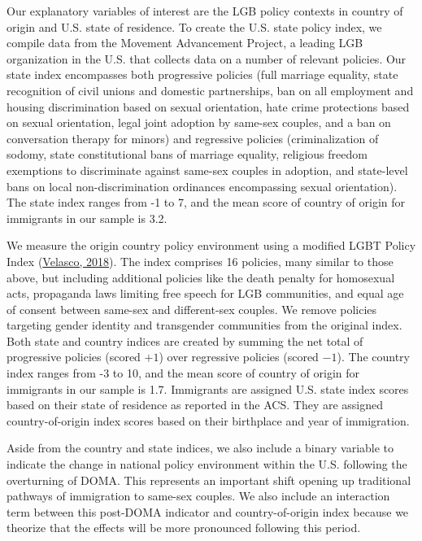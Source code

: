 \documentclass[
  11pt,
]{article}
\begin{document}
Our explanatory variables of interest are the LGB policy contexts in country of origin and U.S. state of residence. To create the U.S. state policy index, we compile data from the Movement Advancement Project, a leading LGB organization in the U.S. that collects data on a number of relevant policies. Our state index encompasses both progressive policies (full marriage equality, state recognition of civil unions and domestic partnerships, ban on all employment and housing discrimination based on sexual orientation, hate crime protections based on sexual orientation, legal joint adoption by same-sex couples, and a ban on conversation therapy for minors) and regressive policies (criminalization of sodomy, state constitutional bans of marriage equality, religious freedom exemptions to discriminate against same-sex couples in adoption, and state-level bans on local non-discrimination ordinances encompassing sexual orientation). The state index ranges from -1 to 7, and the mean score of country of origin for immigrants in our sample is 3.2.

We measure the origin country policy environment using a modified LGBT Policy Index (\protect\hyperlink{ref-velasco_2018}{Velasco, 2018}). The index comprises 16 policies, many similar to those above, but including additional policies like the death penalty for homosexual acts, propaganda laws limiting free speech for LGB communities, and equal age of consent between same-sex and different-sex couples. We remove policies targeting gender identity and transgender communities from the original index. Both state and country indices are created by summing the net total of progressive policies (scored \(+1\)) over regressive policies (scored \(-1\)). The country index ranges from -3 to 10, and the mean score of country of origin for immigrants in our sample is 1.7.
Immigrants are assigned U.S. state index scores based on their state of residence as reported in the ACS. They are assigned country-of-origin index scores based on their birthplace and year of immigration.

Aside from the country and state indices, we also include a binary variable to indicate the change in national policy environment within the U.S. following the overturning of DOMA. This represents an important shift opening up traditional pathways of immigration to same-sex couples. We also include an interaction term between this post-DOMA indicator and country-of-origin index because we theorize that the effects will be more pronounced following this period.
\end{document}
